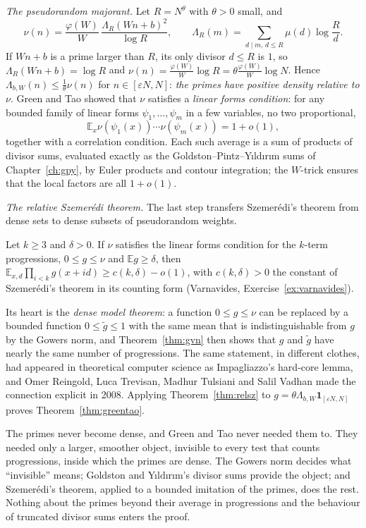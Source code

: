 \emph{The pseudorandom majorant.} Let $R=N^{\theta}$ with $\theta>0$ small, and
\[
\nu(n)=\frac{\varphi(W)}W\,\frac{\Lambda_R(Wn+b)^2}{\log R},\qquad\Lambda_R(m)=\sum_{d\mid m,\,d\le R}\mu(d)\log\frac Rd.
\]
If $Wn+b$ is a prime larger than $R$, its only divisor $d\le R$ is $1$, so $\Lambda_R(Wn+b)=\log R$ and $\nu(n)=\frac{\varphi(W)}W\log R=\theta\frac{\varphi(W)}W\log N$. Hence $\Lambda_{b,W}(n)\le\frac1\theta\nu(n)$ for $n\in[\varepsilon N,N]$: \emph{the primes have positive density relative to $\nu$}. Green and Tao showed that $\nu$ satisfies a \emph{linear forms condition}: for any bounded family of linear forms $\psi_1,\dots,\psi_m$ in a few variables, no two proportional,
\[
\mathbb E_{x}\nu(\psi_1(x))\cdots\nu(\psi_m(x))=1+o(1),
\]
together with a correlation condition. Each such average is a sum of products of divisor sums, evaluated exactly as the Goldston--Pintz--Yıldırım sums of Chapter~\ref{ch:gpy}, by Euler products and contour integration; the $W$-trick ensures that the local factors are all $1+o(1)$.

\emph{The relative Szemerédi theorem.} The last step transfers Szemerédi's theorem from dense sets to dense subsets of pseudorandom weights.

\begin{theorem}\label{thm:relsz}
Let $k\ge3$ and $\delta>0$. If $\nu$ satisfies the linear forms condition for the $k$-term progressions, $0\le g\le\nu$ and $\mathbb E g\ge\delta$, then $\mathbb E_{x,d}\prod_{i<k}g(x+id)\ge c(k,\delta)-o(1)$, with $c(k,\delta)>0$ the constant of Szemerédi's theorem in its counting form (Varnavides, Exercise~\ref{ex:varnavides}).
\end{theorem}

Its heart is the \emph{dense model theorem}: a function $0\le g\le\nu$ can be replaced by a bounded function $0\le\tilde g\le1$ with the same mean that is indistinguishable from $g$ by the Gowers norm, and Theorem~\ref{thm:gvn} then shows that $g$ and $\tilde g$ have nearly the same number of progressions. The same statement, in different clothes, had appeared in theoretical computer science as Impagliazzo's hard-core lemma, and Omer Reingold, Luca Trevisan, Madhur Tulsiani and Salil Vadhan made the connection explicit in 2008. Applying Theorem~\ref{thm:relsz} to $g=\theta\Lambda_{b,W}\mathbf1_{[\varepsilon N,N]}$ proves Theorem~\ref{thm:greentao}.

\begin{beauty}
The primes never become dense, and Green and Tao never needed them to. They needed only a larger, smoother object, invisible to every test that counts progressions, inside which the primes are dense. The Gowers norm decides what ``invisible'' means; Goldston and Yıldırım's divisor sums provide the object; and Szemerédi's theorem, applied to a bounded imitation of the primes, does the rest. Nothing about the primes beyond their average in progressions and the behaviour of truncated divisor sums enters the proof.
\end{beauty}

